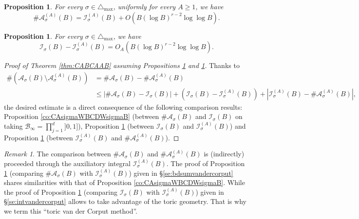 \documentclass[11pt,letterpaper]{amsart}
\newcommand{\CA}{{\mathcal {A}}}
\newcommand{\CB}{{\mathcal {B}}}
\newcommand{\CI}{{\mathcal {I}}}
\theoremstyle{plain}
\numberwithin{equation}{section}
\newtheorem{proposition}[theorem]{Proposition}
\theoremstyle{definition}
\theoremstyle{remark}
\newtheorem{remark}[theorem]{Remark}
\begin{document}
\begin{proposition}\label{prop:keyprop2}
	For every $\sigma\in\triangle_{\max}$, uniformly for every $A\geqslant 1$, we have  $$\#\CA_\sigma^{(A)}(B)=\CI_\sigma^{(A)}(B)+O(B(\log B)^{r-2}\log\log B).$$ 
\end{proposition}

\begin{proposition}\label{prop:keyprop1}
	For every $\sigma\in\triangle_{\max}$, we have
	$$\CI_\sigma(B)-\CI_\sigma^{(A)}(B)=O_A(B(\log B)^{r-2}\log\log B).$$
\end{proposition}

\begin{proof}[Proof of Theorem \ref{thm:CABCAAB} assuming Propositions \ref{prop:keyprop2} and \ref{prop:keyprop1}]
	Thanks to
	\begin{align*}
		\#\left(\CA_\sigma(B)\setminus\CA_\sigma^{(A)}(B)\right)&=\#\CA_\sigma(B)-\#\CA_\sigma^{(A)}(B)\\ &\leqslant \left|\#\CA_\sigma(B)-\CI_\sigma(B)\right|+\left(\CI_\sigma(B)-\CI_\sigma^{(A)}(B)\right)+\left|\CI_\sigma^{(A)}(B)-\#\CA_\sigma^{(A)}(B)\right|,
	\end{align*}
	the desired estimate is a direct consequence of the following comparison results: Proposition \ref{co:CAsigmaWBCDWsigmaB} (between $\#\CA_\sigma(B)$ and $\CI_\sigma(B)$ on taking $\CB_\infty=\prod_{j=1}^{d}]0,1]$), Proposition \ref{prop:keyprop1} (between $\CI_\sigma(B)$ and $\CI_\sigma^{(A)}(B)$) and Proposition \ref{prop:keyprop2} (between $\CI_\sigma^{(A)}(B)$ and $\#\CA_\sigma^{(A)}(B)$).
\end{proof}

\begin{remark}
	The comparison between $\#\CA_\sigma(B)$ and $\#\CA^{(A)}_\sigma(B)$ is (indirectly) proceeded through the auxiliatory integral  $\CI_\sigma^{(A)}(B)$. The proof of Proposition \ref{prop:keyprop2} (comparing $\#\CA_\sigma(B)$ with $\CI_\sigma^{(A)}(B)$) given in \S\ref{se:bdsumvandercorput} shares similarities with that of Proposition \ref{co:CAsigmaWBCDWsigmaB}. While the proof of Proposition \ref{prop:keyprop1} (comparing $\CI_\sigma(B)$ with $\CI_\sigma^{(A)}(B)$) given in \S\ref{se:intvandercorput} allows to take advantage of the toric geometry. That is why we term this ``toric van der Corput method''.
\end{remark}
\end{document}
